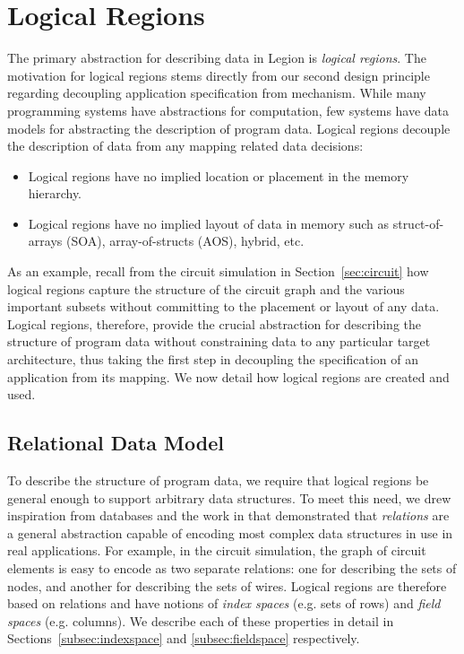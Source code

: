 \section{Logical Regions}
\label{sec:logicalreg}
The primary abstraction for describing data in
Legion is {\em logical regions}. The motivation for 
logical regions stems directly from our second design
principle regarding decoupling application specification
from mechanism. While many programming systems have
abstractions for computation, few systems have data
models for abstracting the description of program data.
Logical regions decouple the 
description of data from any mapping related data decisions:

\begin{itemize}
\item Logical regions have no implied location or
      placement in the memory hierarchy.
\item Logical regions have no implied layout of
      data in memory such as struct-of-arrays (SOA), 
      array-of-structs (AOS), hybrid, etc.
\end{itemize}

As an example, recall from the circuit simulation in 
Section~\ref{sec:circuit} how logical regions capture the 
structure of the circuit graph and the various important
subsets without committing to the placement or layout
of any data. Logical regions, therefore, provide the 
crucial abstraction for describing the structure of 
program data without constraining data to any 
particular target architecture, thus taking the first 
step in decoupling the specification of an application 
from its mapping. We now detail how logical regions
are created and used.

\subsection{Relational Data Model}
\label{subsec:relations}
To describe the structure of program
data, we require that logical regions be 
general enough to support arbitrary data structures.
To meet this need, we drew inspiration from databases
and the work in \cite{Hawkins11} that demonstrated
that {\em relations} are a general abstraction capable
of encoding most complex data structures in use in
real applications. For example, in the circuit simulation,
the graph of circuit elements is easy to encode as two
separate relations: one for describing the 
sets of nodes, and another for describing the 
sets of wires. Logical regions are therefore
based on relations and have notions of {\em index
spaces} (e.g. sets of rows) and {\em field spaces}
(e.g. columns).  We describe each of these properties
in detail in Sections~\ref{subsec:indexspace} and
\ref{subsec:fieldspace} respectively.

